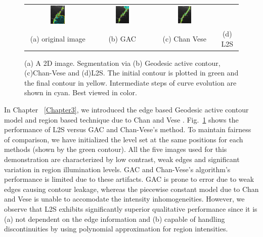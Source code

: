 \begin{figure}[th]
\begin{tabular}{@{}cccc@{}}
\includegraphics[width=0.24\textwidth]{images/L2S_compare/GAC_5}	&
\includegraphics[width=0.24\textwidth]{images/L2S_compare/CV_5}		&
\includegraphics[width=0.24\textwidth]{images/L2S_compare/L2S_5}	\\
(a) original image & (b) GAC & (c) Chan Vese & (d) L2S
\end{tabular}
\caption[L2S vs GAC vs Chan-Vese]{(a) A 2D image. Segmentation via (b) Geodesic active contour, (c)Chan-Vese and (d)L2S. The initial contour is plotted in green and the final contour in yellow. Intermediate steps of curve evolution are shown in cyan. Best viewed in color.}
\label{fig:l2s_compare_GAC_CV}
\end{figure}
In Chapter ~\ref{Chapter3}, we introduced the edge based Geodesic active contour\cite{caselles_geodesic} model and region based technique due to Chan and Vese \cite{chan_vese}. Fig.~\ref{fig:l2s_compare_GAC_CV} shows the performance of L2S versus GAC and Chan-Vese's method. To maintain fairness of comparison, we have initialized the level set at the same positions for each methods (shown by the green contour). All the five images used for this demonstration are characterized by low contrast, weak edges and significant variation in region illumination levels. GAC and Chan-Vese's algorithm's performance is limited due to these artifacts. GAC is prone to error due to weak edges causing contour leakage, whereas the piecewise constant model due to Chan and Vese is unable to accomodate the intensity inhomogeneities. However, we observe that L2S exhibits significantly superior qualitative performance since it is (a) not dependent on the edge information and (b) capable of handling discontinuities by using polynomial approximation for region intensities.

